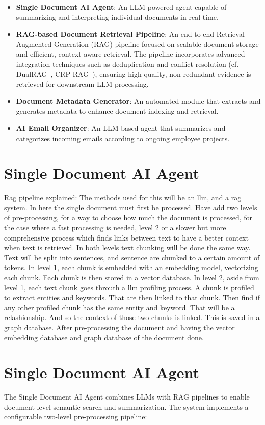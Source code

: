 \begin{itemize}
\item \textbf{Single Document AI Agent}: An LLM-powered agent capable of summarizing and interpreting individual documents in real time.
\item \textbf{RAG-based Document Retrieval Pipeline}: An end-to-end Retrieval-Augmented Generation (RAG) pipeline focused on scalable document storage and efficient, context-aware retrieval. The pipeline incorporates advanced integration techniques such as deduplication and conflict resolution (cf. DualRAG~\cite{Cheng2025}, CRP-RAG~\cite{Xu2024}), ensuring high-quality, non-redundant evidence is retrieved for downstream LLM processing.
\item \textbf{Document Metadata Generator}: An automated module that extracts and generates metadata to enhance document indexing and retrieval.
\item \textbf{AI Email Organizer}: An LLM-based agent that summarizes and categorizes incoming emails according to ongoing employee projects.
\end{itemize}

\section{Single Document AI Agent}
Rag pipeline explained: 
The methods used for this will be an llm, and a rag system. In here the single document must first be processed. 
Have add two levels of pre-processing, for a way to choose how much the document is processed, for the case where a fast processing is needed, level 2 or a slower but more comprehensive process which finds links between text to have a better context when text is retrieved. 
In both levels text chunking will be done the same way. Text will be split into sentences, and sentence are chunked to a certain amount of tokens.
In level 1, each chunk is embedded with an embedding model, vectorizing each chunk. Each chunk is then stored in a vector database.
In level 2, aside from level 1, each text chunk goes throuth a llm profiling process. A chunk is profiled to extract entities and keywords. That are then linked to that chunk. Then find if any other profiled chunk has the same entity and keyword. That will be a relashionship. And so the context of those two chunks is linked. This is saved in a graph database.
After pre-processing the document and having the vector embedding database and graph database of the document done.

\section{Single Document AI Agent}
The Single Document AI Agent combines LLMs with RAG pipelines to enable document-level semantic search and summarization. The system implements a configurable two-level pre-processing pipeline:

